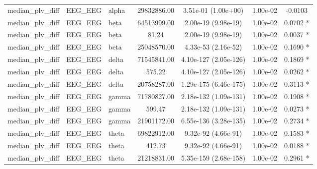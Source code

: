 \begin{tabular}{l l l c c c c}
    median\_plv\_diff & EEG\_EEG & alpha & 29832886.00 & 3.51e-01 (1.00e+00) & 1.00e-02 & -0.0103  \\
    median\_plv\_diff & EEG\_EEG & beta & 64513999.00 & 2.00e-19 (9.98e-19) & 1.00e-02 & 0.0702 * \\
    median\_plv\_diff & EEG\_EEG & beta & 81.24 & 2.00e-19 (9.98e-19) & 1.00e-02 & 0.0037 * \\
    median\_plv\_diff & EEG\_EEG & beta & 25048570.00 & 4.33e-53 (2.16e-52) & 1.00e-02 & 0.1690 * \\
    median\_plv\_diff & EEG\_EEG & delta & 71545841.00 & 4.10e-127 (2.05e-126) & 1.00e-02 & 0.1869 * \\
    median\_plv\_diff & EEG\_EEG & delta & 575.22 & 4.10e-127 (2.05e-126) & 1.00e-02 & 0.0262 * \\
    median\_plv\_diff & EEG\_EEG & delta & 20758287.00 & 1.29e-175 (6.46e-175) & 1.00e-02 & 0.3113 * \\
    median\_plv\_diff & EEG\_EEG & gamma & 71780827.00 & 2.18e-132 (1.09e-131) & 1.00e-02 & 0.1908 * \\
    median\_plv\_diff & EEG\_EEG & gamma & 599.47 & 2.18e-132 (1.09e-131) & 1.00e-02 & 0.0273 * \\
    median\_plv\_diff & EEG\_EEG & gamma & 21901172.00 & 6.55e-136 (3.28e-135) & 1.00e-02 & 0.2734 * \\
    median\_plv\_diff & EEG\_EEG & theta & 69822912.00 & 9.32e-92 (4.66e-91) & 1.00e-02 & 0.1583 * \\
    median\_plv\_diff & EEG\_EEG & theta & 412.73 & 9.32e-92 (4.66e-91) & 1.00e-02 & 0.0188 * \\
    median\_plv\_diff & EEG\_EEG & theta & 21218831.00 & 5.35e-159 (2.68e-158) & 1.00e-02 & 0.2961 * \\
    \bottomrule
\end{tabular}